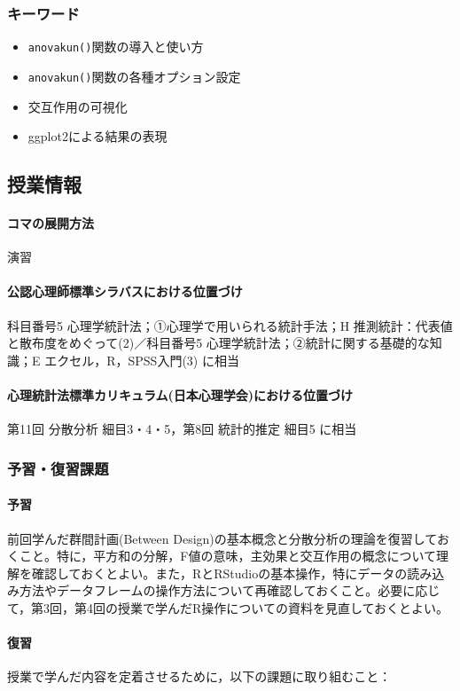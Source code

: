 \subsubsection{キーワード}
\begin{itemize}
	\item \verb|anovakun()|関数の導入と使い方
	\item \verb|anovakun()|関数の各種オプション設定
	\item 交互作用の可視化
	\item ggplot2による結果の表現
\end{itemize}
\subsection{授業情報}
\paragraph{コマの展開方法}
演習
\paragraph{公認心理師標準シラバスにおける位置づけ}
科目番号5 心理学統計法；①心理学で用いられる統計手法；H 推測統計：代表値と散布度をめぐって(2)／科目番号5 心理学統計法；②統計に関する基礎的な知識；E エクセル，R，SPSS入門(3) に相当
\paragraph{心理統計法標準カリキュラム(日本心理学会)における位置づけ}
第11回 分散分析 細目3・4・5，第8回 統計的推定 細目5 に相当
\subsubsection{予習・復習課題}
\paragraph{予習}
前回学んだ群間計画(Between Design)の基本概念と分散分析の理論を復習しておくこと。特に，平方和の分解，F値の意味，主効果と交互作用の概念について理解を確認しておくとよい。また，RとRStudioの基本操作，特にデータの読み込み方法やデータフレームの操作方法について再確認しておくこと。必要に応じて，第3回，第4回の授業で学んだR操作についての資料を見直しておくとよい。

\paragraph{復習}
授業で学んだ内容を定着させるために，以下の課題に取り組むこと：

